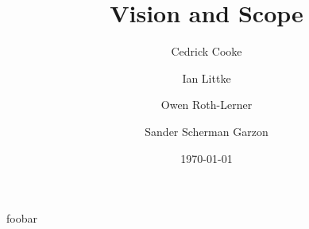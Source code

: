 \documentclass[12pt, letterpaper]{article}
\title{Vision and Scope}
\author{ Cedrick Cooke
    \and Ian Littke
    \and Owen Roth-Lerner
    \and Sander Scherman Garzon
}
\date{\today}
\begin{document}
\maketitle
foobar
\end{document}
